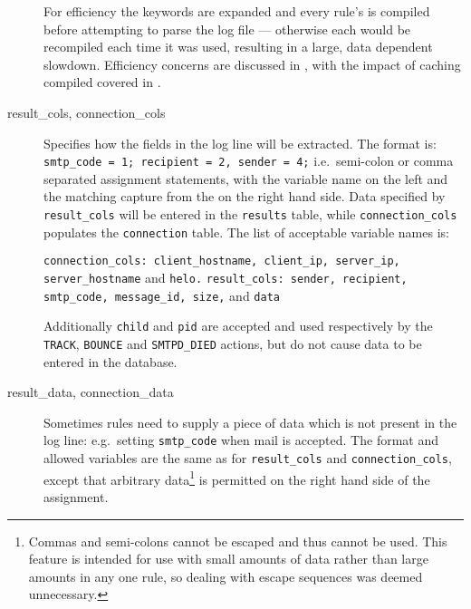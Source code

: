 \begin{description}
        For efficiency the keywords are expanded and every rule's \regex{}
        is compiled before attempting to parse the log file --- otherwise
        each \regex{} would be recompiled each time it was used, resulting
        in a large, data dependent slowdown.  Efficiency concerns are
        discussed in , with the impact of
        caching compiled \regexes{} covered in .

    \item [result\_cols, connection\_cols] Specifies how the fields in the
        log line will be extracted.  The format is:
        \newline \tab{} \texttt{smtp\_code = 1; recipient = 2, sender = 4;}
        \newline i.e.\ semi-colon or comma separated assignment statements,
        with the variable name on the left and the matching capture from
        the \regex{} on the right hand side.  Data specified by
        \texttt{result\_cols} will be entered in the \texttt{results}
        table, while \texttt{connection\_cols} populates the
        \texttt{connection} table.  The list of acceptable variable names
        is:

        \texttt{connection\_cols: client\_hostname, client\_ip, server\_ip,
        \newline \tab{} server\_hostname} and \texttt{helo.\newline}
        \texttt{result\_cols: sender, recipient, smtp\_code, message\_id,
        \newline \tab{} size,} and \texttt{data}

        Additionally \texttt{child} and \texttt{pid} are accepted and used
        respectively by the \texttt{TRACK}, \texttt{BOUNCE} and
        \texttt{SMTPD\_DIED} actions, but do not cause data to be entered
        in the database.

    \item [result\_data, connection\_data] Sometimes rules need to supply a
        piece of data which is not present in the log line: e.g.\ setting
        \texttt{smtp\_code} when mail is accepted.  The format and allowed
        variables are the same as for \texttt{result\_cols} and
        \texttt{connection\_cols}, except that arbitrary
        data\footnote{Commas and semi-colons cannot be escaped and thus
        cannot be used.  This feature is intended for use with small
        amounts of data rather than large amounts in any one rule, so
        dealing with escape sequences was deemed unnecessary.} is permitted
        on the right hand side of the assignment.


\end{description}
